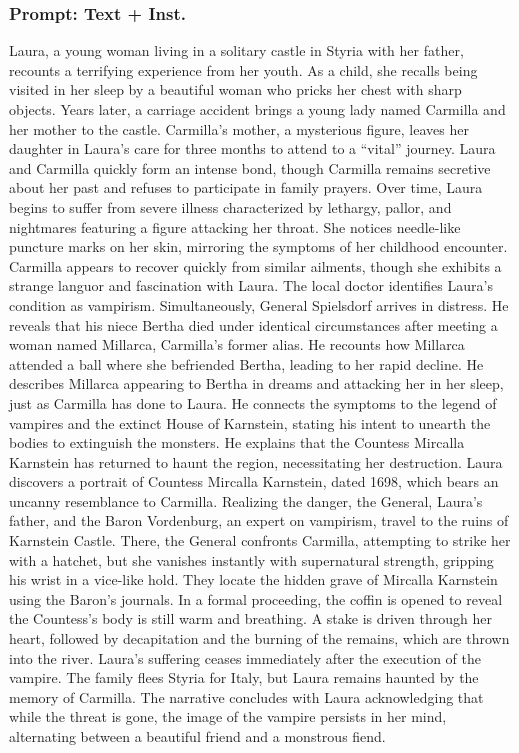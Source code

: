 \documentclass{article} %
\begin{document}
\subsubsection{Prompt: Text + Inst.}

Laura, a young woman living in a solitary castle in Styria with her father, recounts a terrifying experience from her youth. As a child, she recalls being visited in her sleep by a beautiful woman who pricks her chest with sharp objects. Years later, a carriage accident brings a young lady named Carmilla and her mother to the castle. Carmilla’s mother, a mysterious figure, leaves her daughter in Laura’s care for three months to attend to a ``vital'' journey. Laura and Carmilla quickly form an intense bond, though Carmilla remains secretive about her past and refuses to participate in family prayers. Over time, Laura begins to suffer from severe illness characterized by lethargy, pallor, and nightmares featuring a figure attacking her throat. She notices needle-like puncture marks on her skin, mirroring the symptoms of her childhood encounter. Carmilla appears to recover quickly from similar ailments, though she exhibits a strange languor and fascination with Laura. The local doctor identifies Laura’s condition as vampirism. Simultaneously, General Spielsdorf arrives in distress. \textcolor{skipred}{He reveals that his niece Bertha died under identical circumstances after meeting a woman named Millarca, Carmilla’s former alias. He recounts how Millarca attended a ball where she befriended Bertha, leading to her rapid decline. He describes Millarca appearing to Bertha in dreams and attacking her in her sleep, just as Carmilla has done to Laura.} He connects the symptoms to the legend of vampires and the extinct House of Karnstein, stating his intent to unearth the bodies to extinguish the monsters. He explains that the Countess Mircalla Karnstein has returned to haunt the region, necessitating her destruction. Laura discovers a portrait of Countess Mircalla Karnstein, dated 1698, which bears an uncanny resemblance to Carmilla. \textcolor{skipred}{Realizing the danger, the General, Laura’s father, and the Baron Vordenburg, an expert on vampirism, travel to the ruins of Karnstein Castle.} There, the General confronts Carmilla, attempting to strike her with a hatchet, but she vanishes instantly with supernatural strength, gripping his wrist in a vice-like hold. They locate the hidden grave of Mircalla Karnstein using the Baron’s journals. In a formal proceeding, the coffin is opened to reveal the Countess’s body is still warm and breathing. A stake is driven through her heart, followed by decapitation and the burning of the remains, which are thrown into the river. Laura’s suffering ceases immediately after the execution of the vampire. The family flees Styria for Italy, but Laura remains haunted by the memory of Carmilla. The narrative concludes with Laura acknowledging that while the threat is gone, the image of the vampire persists in her mind, alternating between a beautiful friend and a monstrous fiend.
\end{document}
